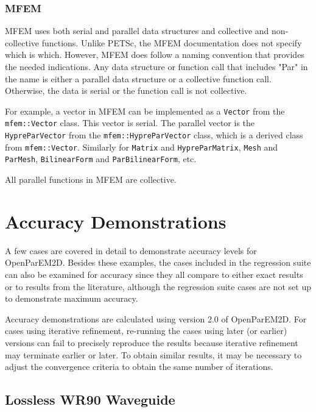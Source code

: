 \documentclass[titlepage]{article}
\renewcommand\_{\textunderscore\linebreak[1]}
\begin{document}
\subsubsection{MFEM}

MFEM uses both serial and parallel data structures and collective and non-collective functions.  Unlike PETSc, the MFEM documentation does not specify which is which. However, MFEM does follow a naming convention that provides the needed indications.  Any data structure or function call that includes "Par" in the name is either a parallel data structure or a collective function call.  Otherwise, the data is serial or the function call is not collective.

For example, a vector in MFEM can be implemented as a \texttt{Vector} from the \texttt{mfem::Vector} class.  This vector is serial.  The parallel vector is the \texttt{HypreParVector} from the \texttt{mfem::HypreParVector} class, which is a derived class from \texttt{mfem::Vector}.  Similarly for \texttt{Matrix} and \texttt{HypreParMatrix}, \texttt{Mesh} and \texttt{ParMesh}, \texttt{BilinearForm} and \texttt{ParBilinearForm}, etc.

All parallel functions in MFEM are collective.

\section{Accuracy Demonstrations}
\label{sec:accuracy}

A few cases are covered in detail to demonstrate accuracy levels for OpenParEM2D.  Besides these examples, the cases included in the regression suite can also be examined for accuracy since they all compare to either exact results or to results from the literature, although the regression suite cases are not set up to demonstrate maximum accuracy.

Accuracy demonstrations are calculated using version 2.0 of OpenParEM2D.  For cases using iterative refinement, re-running the cases using later (or earlier) versions can fail to precisely reproduce the results because iterative refinement may terminate earlier or later.  To obtain similar results, it may be necessary to adjust the convergence criteria to obtain the same number of iterations.

\subsection{Lossless WR90 Waveguide}
\label{sec:WR90_lossless}
\end{document}

